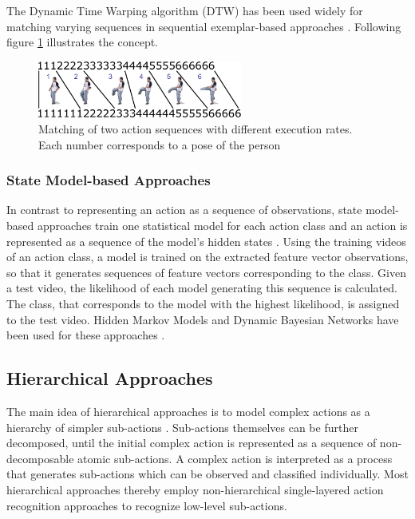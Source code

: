 The Dynamic Time Warping algorithm (DTW) has been used widely for matching varying sequences in sequential exemplar-based approaches \cite{darrell_space-time_1993}\cite{gavrila_towards_1995}\cite{veeraraghavan_function_2006}.
Following figure \ref{fig:exemplar_dtw} illustrates the concept.

\begin{figure}[H]
    \centering
    \includegraphics[width=0.6\textwidth]{img_conventional/exemplar_dtw}
    \caption{Matching of two action sequences with different execution rates. Each number corresponds to a pose of the person \cite{aggarwal_human_2011}}
    \label{fig:exemplar_dtw}
\end{figure}

\subsubsection{State Model-based Approaches}
In contrast to representing an action as a sequence of observations, state model-based approaches train one statistical model for each action class and an action is represented as a sequence of the model's hidden states \cite{cheng_advances_2015}.
Using the training videos of an action class, a model is trained on the extracted feature vector observations, so that it generates sequences of feature vectors corresponding to the class.
Given a test video, the likelihood of each model generating this sequence is calculated.
The class, that corresponds to the model with the highest likelihood, is assigned to the test video.
Hidden Markov Models and Dynamic Bayesian Networks have been used for these approaches \cite{aggarwal_human_2011}.


\subsection{Hierarchical Approaches}
The main idea of hierarchical approaches is to model complex actions as a hierarchy of simpler sub-actions \cite{aggarwal_human_2011}.
Sub-actions themselves can be further decomposed, until the initial complex action is represented as a sequence of non-decomposable atomic sub-actions.
A complex action is interpreted as a process that generates sub-actions which can be observed and classified individually.
Most hierarchical approaches thereby employ non-hierarchical single-layered action recognition approaches to recognize low-level sub-actions.

